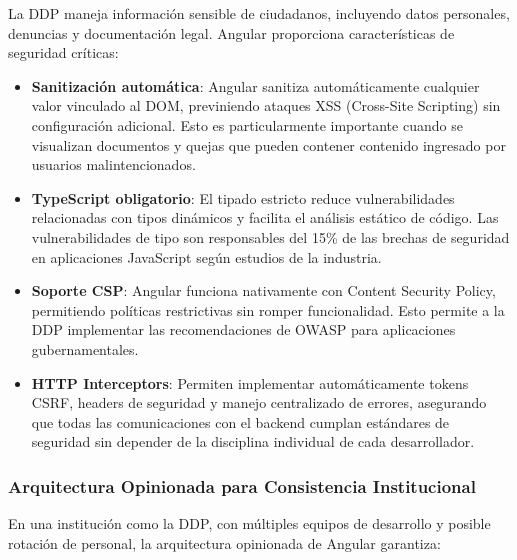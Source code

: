 La DDP maneja información sensible de ciudadanos, incluyendo datos personales, denuncias y documentación legal. Angular proporciona características de seguridad críticas:

\begin{itemize}
    \item \textbf{Sanitización automática}: Angular sanitiza automáticamente cualquier valor vinculado al DOM, previniendo ataques XSS (Cross-Site Scripting) sin configuración adicional. Esto es particularmente importante cuando se visualizan documentos y quejas que pueden contener contenido ingresado por usuarios malintencionados.
    
    \item \textbf{TypeScript obligatorio}: El tipado estricto reduce vulnerabilidades relacionadas con tipos dinámicos y facilita el análisis estático de código. Las vulnerabilidades de tipo son responsables del 15\% de las brechas de seguridad en aplicaciones JavaScript según estudios de la industria.
    
    \item \textbf{Soporte CSP}: Angular funciona nativamente con Content Security Policy, permitiendo políticas restrictivas sin romper funcionalidad. Esto permite a la DDP implementar las recomendaciones de OWASP para aplicaciones gubernamentales.
    
    \item \textbf{HTTP Interceptors}: Permiten implementar automáticamente tokens CSRF, headers de seguridad y manejo centralizado de errores, asegurando que todas las comunicaciones con el backend cumplan estándares de seguridad sin depender de la disciplina individual de cada desarrollador.
\end{itemize}

\subsubsection{Arquitectura Opinionada para Consistencia Institucional}

En una institución como la DDP, con múltiples equipos de desarrollo y posible rotación de personal, la arquitectura opinionada de Angular garantiza:

